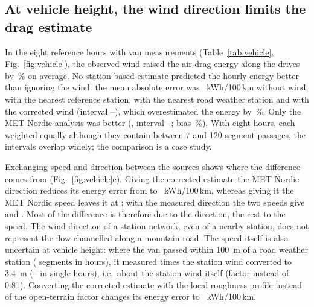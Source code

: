 \subsection{At vehicle height, the wind direction limits the drag estimate}
\label{sec:res-vehicle}
In the eight reference hours with van measurements (Table~\ref{tab:vehicle}, Fig.~\ref{fig:vehicle}), the observed wind raised the air-drag energy along the drives by \enVehPen\,\% on average. No station-based estimate predicted the hourly energy better than ignoring the wind: the mean absolute error was \enVehNone~kWh/100\,km without wind, \enVehRef{} with the nearest reference station, \enVehRoad{} with the nearest road weather station and \enVehCor{} with the corrected wind (interval \enVehCorLo--\enVehCorHi), which overestimated the energy by \enVehBiasCor\,\%. Only the MET Nordic analysis was better (\enVehMn, interval \enVehMnLo--\enVehMnHi; bias \enVehBiasMn\,\%). With eight hours, each weighted equally although they contain between 7 and 120 segment passages, the intervals overlap widely; the comparison is a case study.

Exchanging speed and direction between the sources shows where the difference comes from (Fig.~\ref{fig:vehicle}c). Giving the corrected estimate the MET Nordic direction reduces its energy error from \vehECorCor{} to \vehECorMn~kWh/100\,km, whereas giving it the MET Nordic speed leaves it at \vehEMnCor; with the measured direction the two speeds give \vehECorTrue{} and \vehEMnTrue. Most of the difference is therefore due to the direction, the rest to the speed. The wind direction of a station network, even of a nearby station, does not represent the flow channelled along a mountain road. The speed itself is also uncertain at vehicle height: where the van passed within \SI{100}{m} of a road weather station (\vehNearSeg{} segments in \vehNearHours{} hours), it measured \vehNearRatio{} times the station wind converted to \SI{3.4}{m} (\vehNearRatioMin--\vehNearRatioMax{} in single hours), i.e.\ about the station wind itself (factor \vehNearFactor{} instead of 0.81). Converting the corrected estimate with the local roughness profile instead of the open-terrain factor changes its energy error to \enVehCorLoc~kWh/100\,km.

\begin{table}[!htbp]
\centering
\caption{Validation at vehicle height (\SI{3.4}{m}) against the NOR-XWIND van measurements, by reference hour (\vehHoursDovre{} at Dovre, \vehHoursFroya{} at Frøya; \vehN{} segment passages). Speed MAE: mean over hours of the absolute error of the hourly mean. Energy: hourly mean air-drag energy of a tractor--semitrailer at \SI{80}{km.h^{-1}} along the measured heading; MAE with 95\,\% hour-bootstrap interval, and bias of the mean.}
\label{tab:vehicle}
\small\setlength{\tabcolsep}{3pt}

\end{table}

